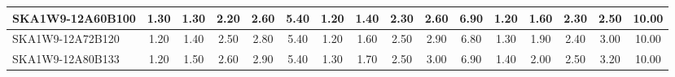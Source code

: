 \begin{table}[H]
{{\begin{tabular}{|lccccc||ccccc||ccccc|}
SKA1W9-12A60B100 & 1.30 \cellcolor{blue!26.40} & 1.30 \cellcolor{red!18.00} & 2.20 \cellcolor{green!30.00} & 2.60 \cellcolor{orange!18.00} & 5.40 \cellcolor{purple!60.00} & 1.20 \cellcolor{blue!18.00} & 1.40 \cellcolor{red!23.25} & 2.30 \cellcolor{green!18.00} & 2.60 \cellcolor{orange!18.00} & 6.90 \cellcolor{purple!43.20} & 1.20 \cellcolor{blue!18.00} & 1.60 \cellcolor{red!25.00} & 2.30 \cellcolor{green!32.00} & 2.50 \cellcolor{orange!23.25} & 10.00 \cellcolor{purple!60.00}\\ \hline 
SKA1W9-12A72B120 & 1.20 \cellcolor{blue!18.00} & 1.40 \cellcolor{red!24.00} & 2.50 \cellcolor{green!48.00} & 2.80 \cellcolor{orange!39.00} & 5.40 \cellcolor{purple!60.00} & 1.20 \cellcolor{blue!18.00} & 1.60 \cellcolor{red!33.75} & 2.50 \cellcolor{green!39.00} & 2.90 \cellcolor{orange!49.50} & 6.80 \cellcolor{purple!34.80} & 1.30 \cellcolor{blue!26.40} & 1.90 \cellcolor{red!46.00} & 2.40 \cellcolor{green!46.00} & 3.00 \cellcolor{orange!49.50} & 10.00 \cellcolor{purple!60.00}\\ \hline 
SKA1W9-12A80B133 & 1.20 \cellcolor{blue!18.00} & 1.50 \cellcolor{red!30.00} & 2.60 \cellcolor{green!54.00} & 2.90 \cellcolor{orange!49.50} & 5.40 \cellcolor{purple!60.00} & 1.30 \cellcolor{blue!26.40} & 1.70 \cellcolor{red!39.00} & 2.50 \cellcolor{green!39.00} & 3.00 \cellcolor{orange!60.00} & 6.90 \cellcolor{purple!43.20} & 1.40 \cellcolor{blue!34.80} & 2.00 \cellcolor{red!53.00} & 2.50 \cellcolor{green!60.00} & 3.20 \cellcolor{orange!60.00} & 10.00 \cellcolor{purple!60.00}\\ \hline 
\end{tabular}}
\vspace{-0.300000cm}
\hspace{1cm} 
}
\end{table}
